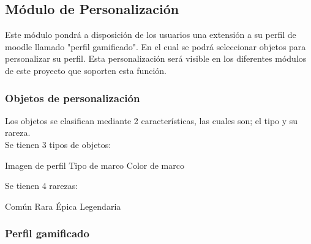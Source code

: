 %

\subsection{Módulo de Personalización}

Este módulo pondrá a disposición de los usuarios una extensión a su perfil de moodle llamado "perfil gamificado". En el cual se podrá
seleccionar objetos para personalizar su perfil. Esta personalización será visible en los diferentes módulos de este proyecto que soporten
esta función.

\subsubsection{Objetos de personalización}


Los objetos se clasifican mediante 2 características, las cuales son; el tipo y su rareza.\\

\noindent Se tienen 3 tipos de objetos:

\begin{multicols}{2}
  \begin{Titemize}
    \Titem Imagen de perfil
    \Titem Tipo de marco
    \Titem Color de marco
  \end{Titemize}

  \noindent Se tienen 4 rarezas:

  \begin{Titemize}
    \Titem Común
    \Titem Rara
    \Titem Épica
    \Titem Legendaria
  \end{Titemize}
\end{multicols}


\subsubsection{Perfil gamificado}

